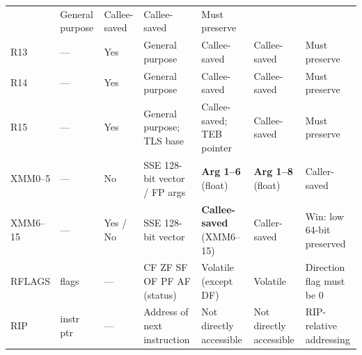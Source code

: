 \documentclass[landscape,a4paper]{article}
\begin{document}
\begin{tcolorbox}[mysec,
  title={Part 2: General Purpose Registers \& Calling Conventions --- x86-64}]
{\begin{tabular}{@{}l l l p{2.9cm} p{2.9cm} p{2.9cm} p{2.5cm}@{}}
  & General purpose
  & Callee-saved
  & Callee-saved
  & Must preserve \\
R13 & ---         & Yes
  & General purpose
  & Callee-saved
  & Callee-saved
  & Must preserve \\
R14 & ---         & Yes
  & General purpose
  & Callee-saved
  & Callee-saved
  & Must preserve \\
R15 & ---         & Yes
  & General purpose; TLS base
  & Callee-saved; TEB pointer
  & Callee-saved
  & Must preserve \\
\midrule
XMM0--5 & ---     & No
  & SSE 128-bit vector / FP args
  & \textbf{Arg 1--6} (float)
  & \textbf{Arg 1--8} (float)
  & Caller-saved \\
XMM6--15 & ---    & Yes / No
  & SSE 128-bit vector
  & \textbf{Callee-saved} (XMM6--15)
  & Caller-saved
  & Win: low 64-bit preserved \\
\midrule
RFLAGS & flags    & ---
  & CF ZF SF OF PF AF (status)
  & Volatile (except DF)
  & Volatile
  & Direction flag must be 0 \\
RIP & instr ptr   & ---
  & Address of next instruction
  & Not directly accessible
  & Not directly accessible
  & RIP-relative addressing \\
\bottomrule
\end{tabular}
}

\vspace{2pt}


\end{tcolorbox}
\end{document}

